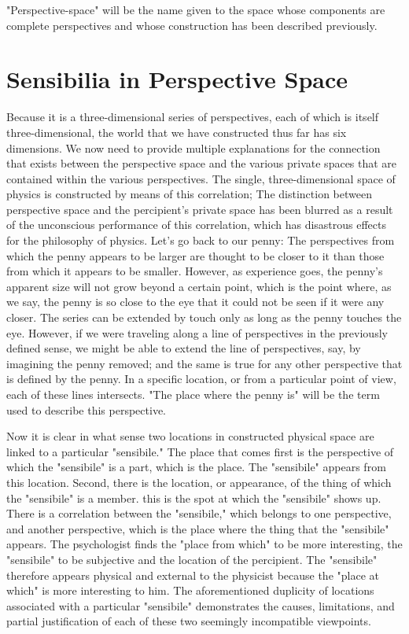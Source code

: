 \documentclass[a4paper,12pt]{book}[2004/02/16]
\theoremstyle{ilemma}
\theoremstyle{itheorem}
\theoremstyle{iother}
\theoremstyle{icorollary}
\theoremstyle{numcorollary}
\theoremstyle{idefinition}
\begin{document}
"Perspective-space" will be the name given to the space whose components are complete perspectives and whose construction has been described previously.

\section{Sensibilia in Perspective Space}
Because it is a three-dimensional series of perspectives, each of which is itself three-dimensional, the world that we have constructed thus far has six dimensions. We now need to provide multiple explanations for the connection that exists between the perspective space and the various private spaces that are contained within the various perspectives. The single, three-dimensional space of physics is constructed by means of this correlation; The distinction between perspective space and the percipient's private space has been blurred as a result of the unconscious performance of this correlation, which has disastrous effects for the philosophy of physics. Let's go back to our penny: The perspectives from which the penny appears to be larger are thought to be closer to it than those from which it appears to be smaller. However, as experience goes, the penny's apparent size will not grow beyond a certain point, which is the point where, as we say, the penny is so close to the eye that it could not be seen if it were any closer. The series can be extended by touch only as long as the penny touches the eye. However, if we were traveling along a line of perspectives in the previously defined sense, we might be able to extend the line of perspectives, say, by imagining the penny removed; and the same is true for any other perspective that is defined by the penny. In a specific location, or from a particular point of view, each of these lines intersects. "The place where the penny is" will be the term used to describe this perspective.

Now it is clear in what sense two locations in constructed physical space are linked to a particular "sensibile." The place that comes first is the perspective of which the "sensibile" is a part, which is the place.
The "sensibile" appears from this location. Second, there is the location, or appearance, of the thing of which the "sensibile" is a member. this is the spot at which the
"sensibile" shows up. There is a correlation between the "sensibile," which belongs to one perspective, and another perspective, which is the place where the thing that the "sensibile" appears. The psychologist finds the "place from which" to be more interesting, the "sensibile" to be subjective and the location of the percipient. The "sensibile" therefore appears physical and external to the physicist because the "place at which" is more interesting to him. The aforementioned duplicity of locations associated with a particular "sensibile" demonstrates the causes, limitations, and partial justification of each of these two seemingly incompatible viewpoints.
\end{document}
